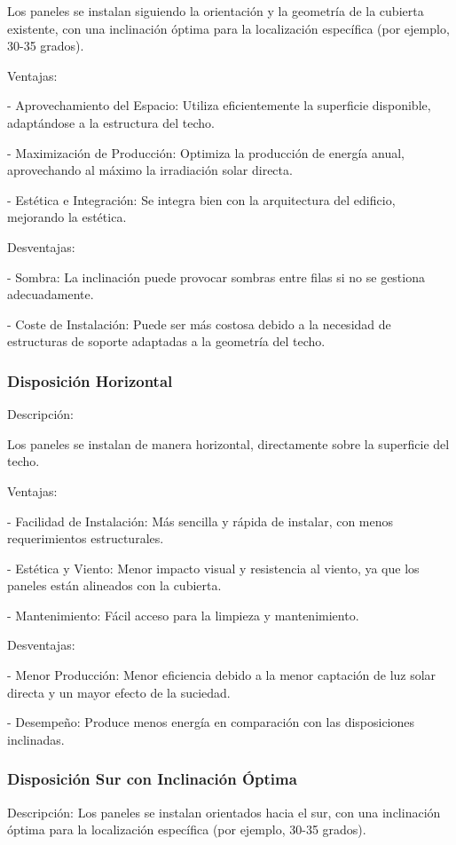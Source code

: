 \documentclass[a4paper,12pt]{article}
\begin{document}
\begin{Form}
Los paneles se instalan siguiendo la orientación y la geometría de la cubierta existente, con una inclinación óptima para la localización específica (por ejemplo, 30-35 grados).

Ventajas:

- Aprovechamiento del Espacio: Utiliza eficientemente la superficie disponible, adaptándose a la estructura del techo.

- Maximización de Producción: Optimiza la producción de energía anual, aprovechando al máximo la irradiación solar directa.

- Estética e Integración: Se integra bien con la arquitectura del edificio, mejorando la estética.

Desventajas:

- Sombra: La inclinación puede provocar sombras entre filas si no se gestiona adecuadamente.

- Coste de Instalación: Puede ser más costosa debido a la necesidad de estructuras de soporte adaptadas a la geometría del techo.


\subsubsection*{Disposición Horizontal}
Descripción:

Los paneles se instalan de manera horizontal, directamente sobre la superficie del techo.


Ventajas:

- Facilidad de Instalación: Más sencilla y rápida de instalar, con menos requerimientos estructurales.

- Estética y Viento: Menor impacto visual y resistencia al viento, ya que los paneles están alineados con la cubierta.

- Mantenimiento: Fácil acceso para la limpieza y mantenimiento.

Desventajas:

- Menor Producción: Menor eficiencia debido a la menor captación de luz solar directa y un mayor efecto de la suciedad.

- Desempeño: Produce menos energía en comparación con las disposiciones inclinadas.

\subsubsection*{Disposición Sur con Inclinación Óptima}
Descripción:
Los paneles se instalan orientados hacia el sur, con una inclinación óptima para la localización específica (por ejemplo, 30-35 grados).



\end{Form}
\end{document}
